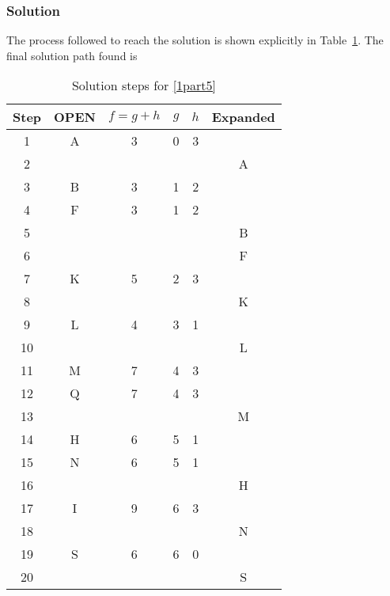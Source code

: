 \documentclass[12pt,letterpaper,titlepage]{article}
\begin{document}
\subsubsection[Answer]{Solution}
The process followed to reach the solution is shown explicitly in Table~\ref{tab:1part5ans}. The final solution path found is 
\begin{table}[htbp]
  \centering
  \caption{Solution steps for \ref{1part5}}
    \begin{tabular}{cccccc}
    \toprule
    Step  & OPEN  & $f=g+h$     & $g$     & $h$     & Expanded \\
    \midrule
    1     & A     & 3     & 0     & 3     &  \\
    2     &       &       &       &       & A \\
    3     & B     & 3     & 1     & 2     &  \\
    4     & F     & 3     & 1     & 2     &  \\
    5     &       &       &       &       & B \\
    6     &       &       &       &       & F \\
    7     & K     & 5     & 2     & 3     &  \\
    8     &       &       &       &       & K \\
    9     & L     & 4     & 3     & 1     &  \\
    10    &       &       &       &       & L \\
    11    & M     & 7     & 4     & 3     &  \\
    12    & Q     & 7     & 4     & 3     &  \\
    13    &       &       &       &       & M \\
    14    & H     & 6     & 5     & 1     &  \\
    15    & N     & 6     & 5     & 1     &  \\
    16    &       &       &       &       & H \\
    17    & I     & 9     & 6     & 3     &  \\
    18    &       &       &       &       & N \\
    19    & S     & 6     & 6     & 0     &  \\
    20    &       &       &       &       & S \\
    \bottomrule
    \end{tabular}%
  \label{tab:1part5ans}%
\end{table}%
\pagebreak
\end{document}
